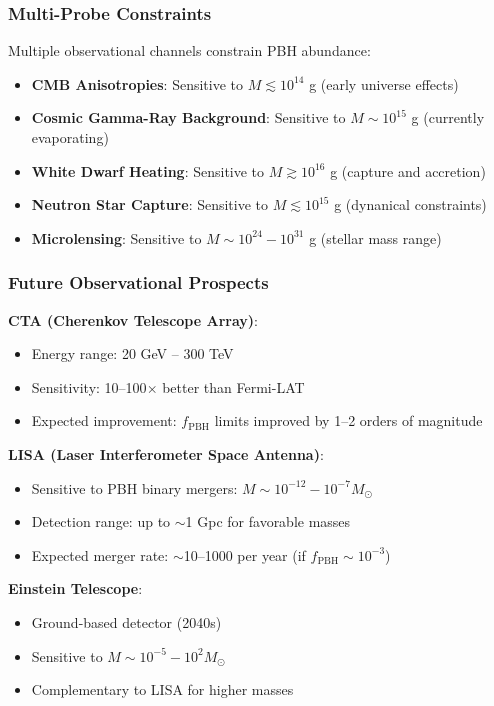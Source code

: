 \subsubsection{Multi-Probe Constraints}

Multiple observational channels constrain PBH abundance:

\begin{itemize}
    \item \textbf{CMB Anisotropies}: Sensitive to $M \lesssim 10^{14}$ g (early universe effects)
    \item \textbf{Cosmic Gamma-Ray Background}: Sensitive to $M \sim 10^{15}$ g (currently evaporating)
    \item \textbf{White Dwarf Heating}: Sensitive to $M \gtrsim 10^{16}$ g (capture and accretion)
    \item \textbf{Neutron Star Capture}: Sensitive to $M \lesssim 10^{15}$ g (dynanical constraints)
    \item \textbf{Microlensing}: Sensitive to $M \sim 10^{24}-10^{31}$ g (stellar mass range)
\end{itemize}

\subsubsection{Future Observational Prospects}

\textbf{CTA (Cherenkov Telescope Array)}:
\begin{itemize}
    \item Energy range: 20 GeV -- 300 TeV
    \item Sensitivity: 10--100$\times$ better than Fermi-LAT
    \item Expected improvement: $f_{\text{PBH}}$ limits improved by 1--2 orders of magnitude
\end{itemize}

\textbf{LISA (Laser Interferometer Space Antenna)}:
\begin{itemize}
    \item Sensitive to PBH binary mergers: $M \sim 10^{-12} - 10^{-7} M_\odot$
    \item Detection range: up to $\sim$1 Gpc for favorable masses
    \item Expected merger rate: $\sim$10--1000 per year (if $f_{\text{PBH}} \sim 10^{-3}$)
\end{itemize}

\textbf{Einstein Telescope}:
\begin{itemize}
    \item Ground-based detector (2040s)
    \item Sensitive to $M \sim 10^{-5} - 10^{2} M_\odot$
    \item Complementary to LISA for higher masses
\end{itemize}

